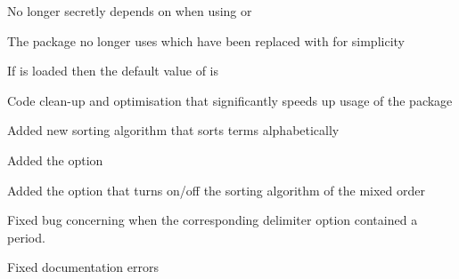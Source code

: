 \begin{changelog}
\begin{change}[version = 1.1, date = 2021-06-03, beta = false]
		\item No longer secretly depends on  when using \xetex{} or \luatex
		\item The package no longer uses  which have been replaced with  for simplicity
		\item If  is loaded then the default value of  is 
	\end{change}
	\begin{change}[version = 1.2, date = 2022-07-09, beta = false]
		\item Code clean-up and optimisation that significantly speeds up usage of the package
		\item Added new sorting algorithm  that sorts terms alphabetically
		\item Added the option  
		\item Added the option  that turns on/off the sorting algorithm of the mixed order
		\item Fixed bug concerning  when the corresponding delimiter option contained a period.
		\item Fixed documentation errors
	\end{change}
\end{changelog}
	
